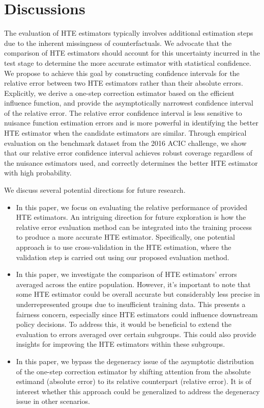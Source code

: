 \documentclass{article}
\theoremstyle{plain}
\theoremstyle{definition}
\theoremstyle{plain}
\begin{document}
\section{Discussions}\label{sec:discussion}

The evaluation of HTE estimators typically involves additional estimation steps due to the inherent missingness of counterfactuals. 
We advocate that the comparison of HTE estimators should account for this uncertainty incurred in the test stage to determine the more accurate estimator with statistical confidence. 
We propose to achieve this goal by constructing confidence intervals for the relative error between two HTE estimators rather than their absolute errors.
Explicitly, we derive a one-step correction estimator based on the efficient influence function, and provide the asymptotically narrowest confidence interval of the relative error.
The relative error confidence interval is less sensitive to nuisance function estimation errors and is more powerful in identifying the better HTE estimator when the candidate estimators are similar.
Through empirical evaluation on the benchmark dataset from the 2016 ACIC challenge, we show that our relative error confidence interval achieves robust coverage regardless of the nuisance estimators used, and correctly determines the better HTE estimator with high probability.


We discuss several potential directions for future research. 
\begin{itemize}
    \item In this paper, we focus on evaluating the relative performance of provided HTE estimators. An intriguing direction for future exploration is how the relative error evaluation method can be integrated into the training process to produce a more accurate HTE estimator. Specifically, one potential approach is to use cross-validation in the HTE estimation, where the validation step is carried out using our proposed evaluation method. 

    \item In this paper, we investigate the comparison of HTE estimators' errors averaged across the entire population. However, it's important to note that some HTE estimator could be overall accurate but considerably less precise in underrepresented groups due to insufficient training data. 
    This presents a fairness concern, especially since HTE estimators could influence downstream policy decisions. To address this, it would be beneficial to extend the evaluation to errors averaged over certain subgroups.
    This could also provide insights for improving the HTE estimators within these subgroups. 

    
    \item In this paper, we bypass the degeneracy issue of the asymptotic distribution of the one-step correction estimator by shifting attention from the absolute estimand (absolute error) to its relative counterpart (relative error). It is of interest whether this approach could be generalized to address the degeneracy issue in other scenarios.
\end{itemize}

\printbibliography

\appendix

\end{document}
